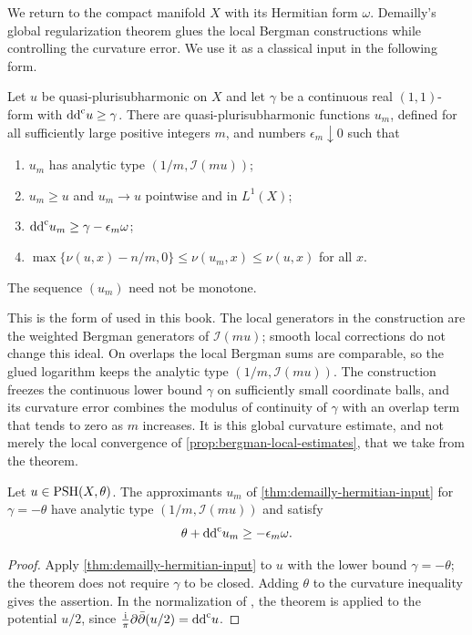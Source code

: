 We return to the compact manifold $X$ with its Hermitian form $\omega$. Demailly's global regularization theorem glues the local Bergman constructions while controlling the curvature error. We use it as a classical input in the following form.

\begin{theorem}\label{thm:demailly-hermitian-input}
Let $u$ be quasi-plurisubharmonic on $X$ and let $\gamma$ be a continuous real $(1,1)$-form with $\mathrm{dd}^{\mathrm{c}} u\geq\gamma$. There are quasi-plurisubharmonic functions $u_m$, defined for all sufficiently large positive integers $m$, and numbers $\epsilon_m\downarrow0$ such that
\begin{enumerate}
\item $u_m$ has analytic type $(1/m,\mathcal I(mu))$;
\item $u_m\geq u$ and $u_m\to u$ pointwise and in $L^1(X)$;
\item $\mathrm{dd}^{\mathrm{c}} u_m\geq\gamma-\epsilon_m\omega$;
\item $\max\{\nu(u,x)-n/m,0\}\leq\nu(u_m,x)\leq\nu(u,x)$ for all $x$.
\end{enumerate}
The sequence $(u_m)$ need not be monotone.
\end{theorem}

This is the form of \cite[Theorem 14.12]{DemAM11} used in this book. The local generators in the construction are the weighted Bergman generators of $\mathcal I(mu)$; smooth local corrections do not change this ideal. On overlaps the local Bergman sums are comparable, so the glued logarithm keeps the analytic type $(1/m,\mathcal I(mu))$. The construction freezes the continuous lower bound $\gamma$ on sufficiently small coordinate balls, and its curvature error combines the modulus of continuity of $\gamma$ with an overlap term that tends to zero as $m$ increases. It is this global curvature estimate, and not merely the local convergence of \cref{prop:bergman-local-estimates}, that we take from the theorem.

\begin{corollary}\label{cor:nonclosed-analytic-approximation}
Let $u\in\mathrm{PSH}(X,\theta)$. The approximants $u_m$ of \cref{thm:demailly-hermitian-input} for $\gamma=-\theta$ have analytic type $(1/m,\mathcal I(mu))$ and satisfy
\[
 \theta+\mathrm{dd}^{\mathrm{c}} u_m\geq-\epsilon_m\omega.
\]
\end{corollary}
\begin{proof}
Apply \cref{thm:demailly-hermitian-input} to $u$ with the lower bound $\gamma=-\theta$; the theorem does not require $\gamma$ to be closed. Adding $\theta$ to the curvature inequality gives the assertion. In the normalization of \cite{DemAM11}, the theorem is applied to the potential $u/2$, since $\frac{\mathrm{i}}{\pi}\partial\bar\partial(u/2)=\mathrm{dd}^{\mathrm{c}} u$.
\end{proof}

